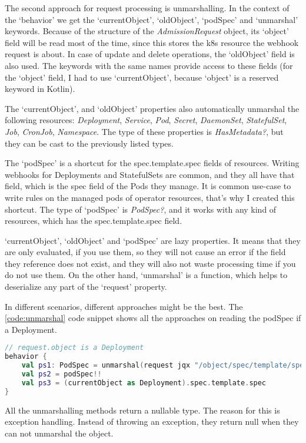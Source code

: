 The second approach for request processing is unmarshalling. In the context of the `behavior' we get the `currentObject', `oldObject', `podSpec' and `unmarshal' keywords. Because of the structure of the \emph{AdmissionRequest} object, its `object' field will be read most of the time, since this stores the k8s resource the webhook request is about. In case of update and delete operations, the `oldObject' field is also used. The keywords with the same names provide access to these fields (for the `object' field, I had to use `currentObject', because `object' is a reserved keyword in Kotlin). 

The `currentObject', and `oldObject' properties also automatically unmarshal the following resources: \emph{Deployment}, \emph{Service}, \emph{Pod}, \emph{Secret}, \emph{DaemonSet}, \emph{StatefulSet}, \emph{Job}, \emph{CronJob}, \emph{Namespace}. The type of these properties is \emph{HasMetadata?}, but they can be cast to the previously listed types.

The `podSpec' is a shortcut for the spec.template.spec fields of resources. Writing webhooks for Deployments and StatefulSets are common, and they all have that field, which is the spec field of the Pods they manage. It is common use-case to write rules on the managed pods of operator resources, that's why I created this shortcut. The type of `podSpec' is \emph{PodSpec?}, and it works with any kind of resources, which has the spec.template.spec field.

`currentObject', `oldObject' and `podSpec' are lazy properties. It means that they are only evaluated, if you use them, so they will not cause an error if the field they reference does not exist, and they will also not waste processing time if you do not use them. On the other hand, `unmarshal' is a function, which helps to deserialize any part of the `request' property.

In different scenarios, different approaches might be the best. The \ref{code:unmarshal} code snippet shows all the approaches on reading the podSpec if a Deployment.

\begin{lstlisting}[caption={Unmarshalling},language=Kotlin,label=code:unmarshal]
// request.object is a Deployment
behavior {
    val ps1: PodSpec = unmarshal(request jqx "/object/spec/template/spec")!!
    val ps2 = podSpec!!
    val ps3 = (currentObject as Deployment).spec.template.spec
}
\end{lstlisting}

All the unmarshalling methods return a nullable type. The reason for this is exception handling. Instead of throwing an exception, they return null when they can not unmarshal the object.

